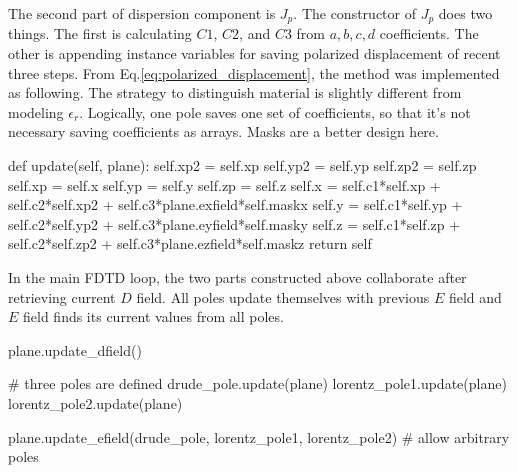 The second part of dispersion component is $J_p$. The constructor of $J_p$ does two things. The first is calculating
$C1$, $C2$, and $C3$ from $a,b,c,d$ coefficients. The other is appending instance variables for saving polarized
displacement of recent three steps. From Eq.\ref{eq:polarized_displacement}, the method  was implemented
as following. The strategy to distinguish material is slightly different from modeling $\epsilon_r$. Logically, one pole
saves one set of coefficients, so that it's not necessary saving coefficients as arrays. Masks are a better design here.
\begin{code}
    def update(self, plane):
        self.xp2 = self.xp
        self.yp2 = self.yp
        self.zp2 = self.zp
        self.xp = self.x
        self.yp = self.y
        self.zp = self.z
        self.x = self.c1*self.xp + self.c2*self.xp2 + self.c3*plane.exfield*self.maskx
        self.y = self.c1*self.yp + self.c2*self.yp2 + self.c3*plane.eyfield*self.masky
        self.z = self.c1*self.zp + self.c2*self.zp2 + self.c3*plane.ezfield*self.maskz
        return self
\end{code}
In the main FDTD loop, the two parts constructed above collaborate after retrieving current $D$ field. All poles update
themselves with previous $E$ field and $E$ field finds its current values from all poles.
\begin{code}
  plane.update_dfield()

  # three poles are defined 
  drude_pole.update(plane)
  lorentz_pole1.update(plane)
  lorentz_pole2.update(plane)

  plane.update_efield(drude_pole, lorentz_pole1, lorentz_pole2) # allow arbitrary poles 
\end{code}
